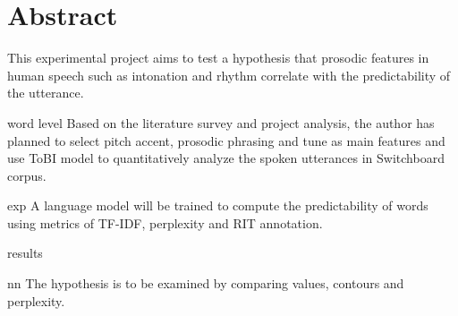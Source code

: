 \chapter*{\Large \center Abstract}


This experimental project aims to test a hypothesis that prosodic features in human speech such as intonation and rhythm correlate with the predictability of the utterance. 

word level 
Based on the literature survey and project analysis, the author has planned to select pitch accent, prosodic phrasing and tune as main features and use ToBI model to quantitatively analyze the spoken utterances in Switchboard corpus. 

exp
A language model will be trained to compute the predictability of words using metrics of TF-IDF, perplexity and RIT annotation. 

results

nn
The hypothesis is to be examined by comparing values, contours and perplexity.